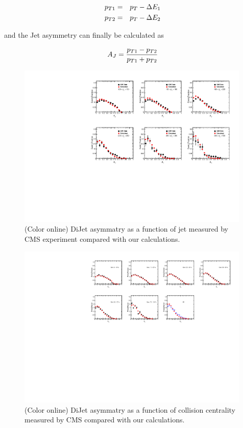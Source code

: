 \documentclass[reprint,amsmath,amssymb,aps,showpacs,showkeys]{revtex4}
\begin{document}
 \begin{eqnarray}
   p_{T1} &= & p_{T} - \Delta E_1 \nonumber \\
   p_{T2} &= & p_{T} - \Delta E_2 \nonumber   
 \end{eqnarray}

 and the Jet asymmetry can finally be calculated as

\begin{equation}
  A_{J} = \frac{p_{T1}-p_{T2}}{p_{T1}+p_{T2}} \\
\end{equation}
 


 
 


\begin{figure}
  \includegraphics[width=0.99\textwidth]{Figures/Fig_Asym_DiJet_Pt.pdf}
  \caption{(Color online) DiJet asymmatry as a function of jet \pt measured by CMS experiment
    compared with our calculations.}
  \label{Fig:DiJetAsymPt}
\end{figure}



\begin{figure}
  \includegraphics[width=0.99\textwidth]{Figures/Fig_Asym_DiJet_Centrality.pdf}
  \caption{(Color online) DiJet asymmatry as a function of collision centrality
    measured by CMS compared with our calculations.}
  \label{Fig:DiJetAsymCent}
\end{figure}
\end{document}
